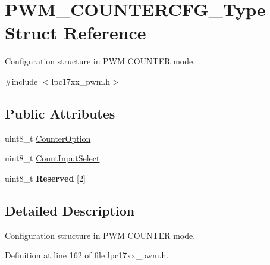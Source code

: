 \hypertarget{struct_p_w_m___c_o_u_n_t_e_r_c_f_g___type}{\section{\-P\-W\-M\-\_\-\-C\-O\-U\-N\-T\-E\-R\-C\-F\-G\-\_\-\-Type \-Struct \-Reference}
\label{struct_p_w_m___c_o_u_n_t_e_r_c_f_g___type}
}


\-Configuration structure in \-P\-W\-M \-C\-O\-U\-N\-T\-E\-R mode.  




{\ttfamily \#include $<$lpc17xx\-\_\-pwm.\-h$>$}

\subsection*{\-Public \-Attributes}
\begin{DoxyCompactItemize}
\item 
uint8\-\_\-t \hyperlink{struct_p_w_m___c_o_u_n_t_e_r_c_f_g___type_af9f95c59d3e6b17ac7df5b046c4414b8}{\-Counter\-Option}
\item 
uint8\-\_\-t \hyperlink{struct_p_w_m___c_o_u_n_t_e_r_c_f_g___type_aed8184648a18ab535b3662d431030bc9}{\-Count\-Input\-Select}
\item 
\hypertarget{struct_p_w_m___c_o_u_n_t_e_r_c_f_g___type_a683a862f06f76ff4ee1b564142460eb9}{uint8\-\_\-t {\bfseries \-Reserved} \mbox{[}2\mbox{]}}\label{struct_p_w_m___c_o_u_n_t_e_r_c_f_g___type_a683a862f06f76ff4ee1b564142460eb9}

\end{DoxyCompactItemize}


\subsection{\-Detailed \-Description}
\-Configuration structure in \-P\-W\-M \-C\-O\-U\-N\-T\-E\-R mode. 

\-Definition at line 162 of file lpc17xx\-\_\-pwm.\-h.



